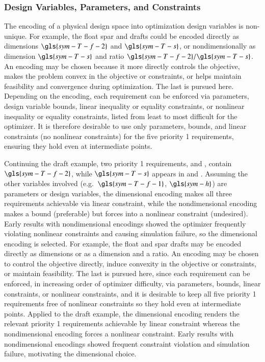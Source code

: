 \subsubsection{Design Variables, Parameters, and Constraints}
The encoding of a physical design space into optimization design variables is non-unique.
\ifdefined\DISSERTATION
    For example, the float spar and drafts could be encoded directly as dimensions $\gls{sym-T-f-2}$ and $\gls{sym-T-s}$, or nondimensionally as dimension $\gls{sym-T-s}$ and ratio $\gls{sym-T-f-2}/\gls{sym-T-s}$.
    An encoding may be chosen because it more directly controls the objective, makes the problem convex in the objective or constraints, or helps maintain feasibility and convergence during optimization.
    The last is pursued here.
    Depending on the encoding, each requirement can be enforced via parameters, design variable bounds, linear inequality or equality constraints, or nonlinear inequality or equality constraints, listed from least to most difficult for the optimizer.
    It is therefore desirable to use only parameters, bounds, and linear constraints (no nonlinear constraints) for the five priority 1 requirements, ensuring they hold even at intermediate points.
    
    Continuing the draft example, two priority 1 requirements,  and , contain $\gls{sym-T-f-2}$, while $\gls{sym-T-s}$ appears in  and .
    Assuming the other variables involved (e.g.\ $\gls{sym-T-f-1}$, $\gls{sym-h}$) are parameters or design variables, the dimensional encoding makes all three requirements achievable via linear constraint, while the nondimensional encoding makes  a bound (preferable) but forces  into a nonlinear constraint (undesired).
    Early results with nondimensional encodings \citep{mccabe_multidisciplinary_2022} showed the optimizer frequently violating nonlinear constraints and causing simulation failure, so the dimensional encoding is selected.
\else
    For example, the float and spar drafts may be encoded directly as dimensions or as a dimension and a ratio.
    An encoding may be chosen to control the objective directly, induce convexity in the objective or constraints, or maintain feasibility.
    The last is pursued here, since each requirement can be enforced, in increasing order of optimizer difficulty, via parameters, bounds, linear constraints, or nonlinear constraints,
    and it is desirable to keep all five priority 1 requirements free of nonlinear constraints so they hold even at intermediate points.
    Applied to the draft example, the dimensional encoding renders the relevant priority 1 requirements achievable by linear constraint whereas the nondimensional encoding forces a nonlinear constraint.
    Early results with nondimensional encodings \citep{mccabe_multidisciplinary_2022} showed frequent constraint violation and simulation failure, motivating the dimensional choice.
\fi


